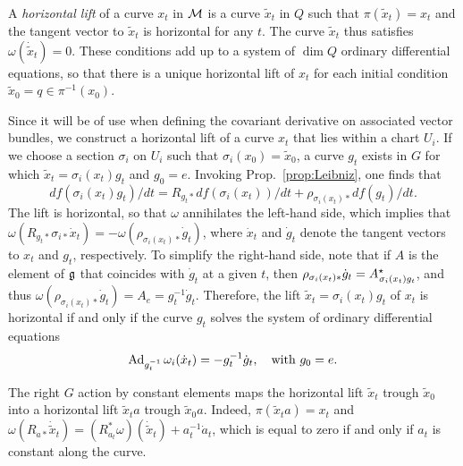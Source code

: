 \documentclass[
final,
11pt,
a4paper,
DIV=11,
headinclude=true,
footinclude=false,
bibliography=totoc,
twoside=true,  %
BCOR=5mm
]{scrbook}
\begin{document}
A \emph{horizontal lift} of a curve $x_t$ in $\mathcal{M}$ is a curve 
$\tilde{x}_t$ in $Q$ such that $\pi(\tilde{x}_t) = x_t$ and the 
tangent vector to $\tilde{x}_t$ is horizontal for any $t$. The 
curve $\tilde{x}_t$ thus satisfies $\omega(\dot{\tilde{x}}_t) 
= 0$. These conditions add up to a system of $\dim Q$ ordinary 
differential equations, so that there is a unique horizontal lift 
of $x_t$ for each initial condition $\tilde{x}_0 = q \in 
\pi^{-1}(x_0)$.

Since it will be of use when defining the covariant derivative on 
associated vector bundles, we construct a horizontal lift of a 
curve $x_t$ that lies within a chart $U_i$. If we choose a 
section $\sigma_i$ on $U_i$ such that $\sigma_i(x_0) = 
\tilde{x}_0$, a curve $g_{t}$ exists in $G$ for which 
$\tilde{x}_t = \sigma_i(x_t)g_t$ and $g_0 = e$. Invoking 
Prop.~\ref{prop:Leibniz}, one finds that
\begin{equation*}
  df(\sigma_i(x_t)g_t)/dt
  = R_{g_t*} df(\sigma_i(x_t))/dt + \rho_{\sigma_i(x_t)*} 
  df(g_t)/dt.
\end{equation*}
The lift is horizontal, so that $\omega$ annihilates the 
left-hand side, which implies that $\omega(R_{g_t*} \sigma_{i*} 
\dot{x}_t) = - \omega(\rho_{\sigma_i(x_t)*}\dot{g}_t)$, where 
$\dot{x}_t$ and $\dot{g}_t$ denote the tangent vectors to $x_t$ 
and $g_t$, respectively.  To simplify the right-hand side, note 
that if $A$ is the element of $\mathfrak{g}$ that coincides with 
$\dot{g}_t$ at a given $t$, then $\rho_{\sigma_i(x_t)*}\dot{g}_t 
= A^\star\hspace{-4pt}\raisebox{-3pt}{\scriptsize 
  $\sigma_i(x_t)g_t$}$, and thus $\omega(\rho_{\sigma_i(x_t)*} 
\dot{g}_t) = A_e = g^{-1}_t\dot{g}_t$. Therefore, the lift 
$\tilde{x}_t = \sigma_i(x_t)g_t$ of $x_t$ is horizontal if and 
only if the curve $g_t$ solves the system of ordinary 
differential equations
\begin{equation}
\label{eq:Gcurve_hor_lift}
  \operatorname{Ad}_{g^{-1}_t} \omega_i(\dot{x}_t) = -g^{-1}_t \dot{g}_t,
  \quad\text{with}~g_0 = e.
\end{equation}

The right $G$ action by constant elements maps the horizontal 
lift $\tilde{x}_t$ trough $\tilde{x}_0$ into a horizontal lift 
$\tilde{x}_t a$ trough $\tilde{x}_0 a$. Indeed, $\pi(\tilde{x}_t 
a) = x_t$ and $\omega(R_{a*}\dot{\tilde{x}}_t) = 
(R_{a_t}^*\omega)(\dot{\tilde{x}}_t) + a_t^{-1} \dot{a}_t$, which 
is equal to zero if and only if $a_t$ is constant along the 
curve. 
\end{document}
